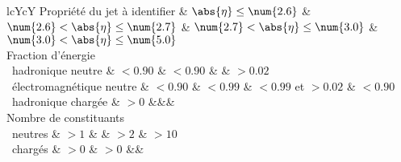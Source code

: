 \begin{tabularx}{\textwidth}{lcYcY}
\toprule
Propriété du jet à identifier & $\abs{\eta}\leq\num{2.6}$ & $\num{2.6}<\abs{\eta}\leq\num{2.7}$ & $\num{2.7}<\abs{\eta}\leq\num{3.0}$ & $\num{3.0}<\abs{\eta}\leq\num{5.0}$ \\
\midrule
Fraction d'énergie\\
\ hadronique neutre & $<\num{0.90}$ & $<\num{0.90}$ &  & $>\num{0.02}$ \\
\ électromagnétique neutre & $<\num{0.90}$ & $<\num{0.99}$ & $<\num{0.99}$ et $>\num{0.02}$ & $<\num{0.90}$ \\
\ hadronique chargée & $>\num{0}$ &&&\\
\midrule
Nombre de constituants\\
\ neutres & $>\num{1}$ & & $>\num{2}$ & $>\num{10}$ \\
\ chargés & $>\num{0}$ & $>\num{0}$ &&\\
\bottomrule
\end{tabularx}
